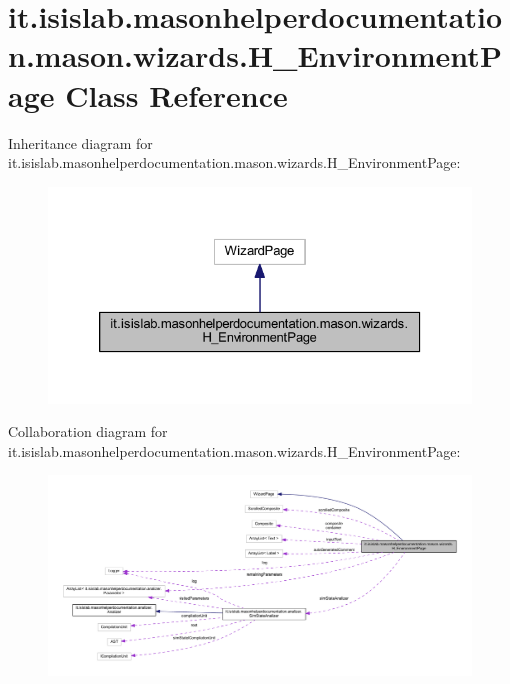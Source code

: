 \hypertarget{classit_1_1isislab_1_1masonhelperdocumentation_1_1mason_1_1wizards_1_1_h___environment_page}{\section{it.\-isislab.\-masonhelperdocumentation.\-mason.\-wizards.\-H\-\_\-\-Environment\-Page Class Reference}
\label{classit_1_1isislab_1_1masonhelperdocumentation_1_1mason_1_1wizards_1_1_h___environment_page}
}


Inheritance diagram for it.\-isislab.\-masonhelperdocumentation.\-mason.\-wizards.\-H\-\_\-\-Environment\-Page\-:\nopagebreak
\begin{figure}[H]
\begin{center}
\leavevmode
\includegraphics[width=326pt]{classit_1_1isislab_1_1masonhelperdocumentation_1_1mason_1_1wizards_1_1_h___environment_page__inherit__graph}
\end{center}
\end{figure}


Collaboration diagram for it.\-isislab.\-masonhelperdocumentation.\-mason.\-wizards.\-H\-\_\-\-Environment\-Page\-:\nopagebreak
\begin{figure}[H]
\begin{center}
\leavevmode
\includegraphics[width=350pt]{classit_1_1isislab_1_1masonhelperdocumentation_1_1mason_1_1wizards_1_1_h___environment_page__coll__graph}
\end{center}
\end{figure}
